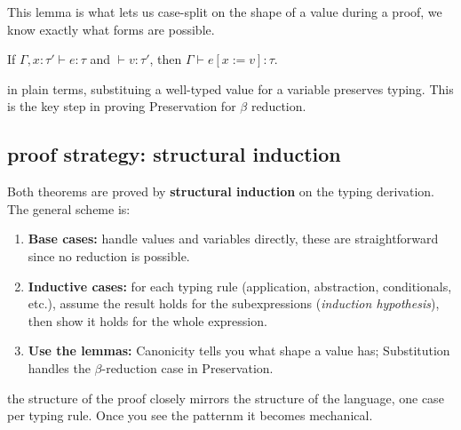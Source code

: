 This lemma is what lets us case-split on the shape of a value during a proof, we know exactly what forms are possible.

\begin{lemma}[Substitution]
If $\Gamma, x : \tau' \vdash e : \tau$ and $\vdash v : \tau'$, then
$\Gamma \vdash e[x := v] : \tau$.
\end{lemma}

in plain terms, substituing a well-typed value for a variable preserves typing. This is the key step in proving Preservation for $\beta$ reduction.

\subsection{proof strategy: structural induction}
Both theorems are proved by \textbf{structural induction} on the typing derivation. The general scheme is:

\begin{enumerate}
    \item \textbf{Base cases:} handle values and variables directly, these are straightforward since no reduction is possible.
    \item \textbf{Inductive cases:} for each typing rule (application,
    abstraction, conditionals, etc.), assume the result holds for the
    subexpressions (\emph{induction hypothesis}), then show it holds for
    the whole expression.
    \item \textbf{Use the lemmas:} Canonicity tells you what shape a
    value has; Substitution handles the $\beta$-reduction case in
    Preservation.
\end{enumerate}

the structure of the proof closely mirrors the structure of the language, one case per typing rule. Once you see the patternm it becomes mechanical.
